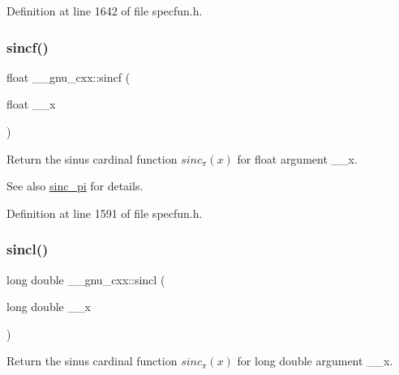 Definition at line 1642 of file specfun.\+h.

\mbox{\label{group__gnu__math__spec__func_gaa87f0734cfe7823c932511ac2f0a876c}} 
\subsubsection{\texorpdfstring{sincf()}{sincf()}}
{\footnotesize\ttfamily float \+\_\+\+\_\+gnu\+\_\+cxx\+::sincf (\begin{DoxyParamCaption}\item[{float}]{\+\_\+\+\_\+x }\end{DoxyParamCaption})\hspace{0.3cm}{\ttfamily [inline]}}

Return the sinus cardinal function $ sinc_\pi(x) $ for {\ttfamily float} argument {\ttfamily \+\_\+\+\_\+x}.

\begin{DoxySeeAlso}{See also}
\hyperlink{group__gnu__math__spec__func_ga5195270024403b985e7d4f2f935f8779}{sinc\+\_\+pi} for details. 
\end{DoxySeeAlso}


Definition at line 1591 of file specfun.\+h.

\mbox{\label{group__gnu__math__spec__func_ga79a8fd931f5ad4f737e2931e636149ac}} 
\subsubsection{\texorpdfstring{sincl()}{sincl()}}
{\footnotesize\ttfamily long double \+\_\+\+\_\+gnu\+\_\+cxx\+::sincl (\begin{DoxyParamCaption}\item[{long double}]{\+\_\+\+\_\+x }\end{DoxyParamCaption})\hspace{0.3cm}{\ttfamily [inline]}}

Return the sinus cardinal function $ sinc_\pi(x) $ for {\ttfamily long double} argument {\ttfamily \+\_\+\+\_\+x}.

